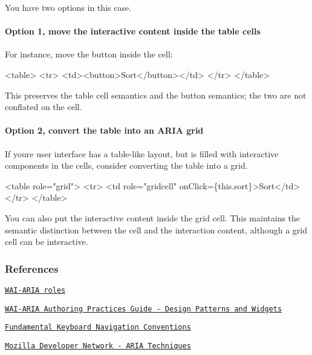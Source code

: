 You have two options in this case.

\paragraph*{Option 1, move the interactive content inside the table cells}

For instance, move the button inside the cell\+:


\begin{DoxyCode}
<table>
  <tr>
    <td><button>Sort</button></td>
  </tr>
</table>
\end{DoxyCode}


This preserves the table cell semantics and the button semantics; the two are not conflated on the cell.

\paragraph*{Option 2, convert the table into an A\+R\+IA grid}

If you\textquotesingle{}re user interface has a table-\/like layout, but is filled with interactive components in the cells, consider converting the table into a grid.


\begin{DoxyCode}
<table role="grid">
  <tr>
    <td role="gridcell" onClick=\{this.sort\}>Sort</td>
  </tr>
</table>
\end{DoxyCode}


You can also put the interactive content inside the grid cell. This maintains the semantic distinction between the cell and the interaction content, although a grid cell can be interactive.

\subsubsection*{References}


\begin{DoxyEnumerate}
\item \href{https://www.w3.org/TR/wai-aria-1.1/#usage_intro}{\tt W\+A\+I-\/\+A\+R\+IA roles}
\end{DoxyEnumerate}
\begin{DoxyEnumerate}
\item \href{https://www.w3.org/TR/wai-aria-practices-1.1/#aria_ex}{\tt W\+A\+I-\/\+A\+R\+IA Authoring Practices Guide -\/ Design Patterns and Widgets}
\end{DoxyEnumerate}
\begin{DoxyEnumerate}
\item \href{https://www.w3.org/TR/wai-aria-practices-1.1/#kbd_generalnav}{\tt Fundamental Keyboard Navigation Conventions}
\end{DoxyEnumerate}
\begin{DoxyEnumerate}
\item \href{https://developer.mozilla.org/en-US/docs/Web/Accessibility/ARIA/ARIA_Techniques/Using_the_button_role#Keyboard_and_focus}{\tt Mozilla Developer Network -\/ A\+R\+IA Techniques}
\end{DoxyEnumerate}

